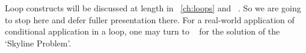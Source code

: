 Loop constructs will be discussed at length in ~\autoref{ch:loops} and ~.
So we are going to stop here and defer fuller presentation there.
For a real-world application of conditional application in a loop, one may turn to
~\pageref{lst:silhouette-skyline} for the solution of the `Skyline Problem'.



